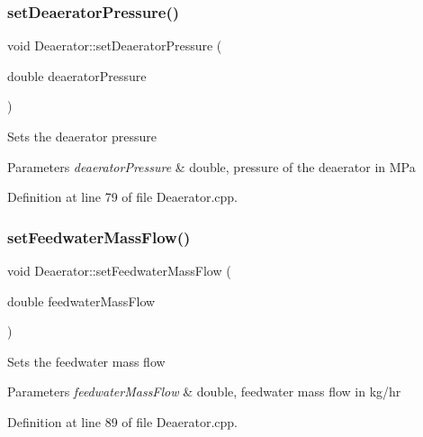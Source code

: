 \subsubsection{\texorpdfstring{set\+Deaerator\+Pressure()}{setDeaeratorPressure()}\hspace{0.1cm}{\footnotesize\ttfamily [3/3]}}
{\footnotesize\ttfamily void Deaerator\+::set\+Deaerator\+Pressure (\begin{DoxyParamCaption}\item[{double}]{deaerator\+Pressure }\end{DoxyParamCaption})}

Sets the deaerator pressure 
\begin{DoxyParams}{Parameters}
{\em deaerator\+Pressure} & double, pressure of the deaerator in M\+Pa \\
\hline
\end{DoxyParams}


Definition at line 79 of file Deaerator.\+cpp.

\mbox{\label{class_deaerator_ada95cb2557bc43602d7bcefbad66c853}} 
\subsubsection{\texorpdfstring{set\+Feedwater\+Mass\+Flow()}{setFeedwaterMassFlow()}\hspace{0.1cm}{\footnotesize\ttfamily [1/3]}}
{\footnotesize\ttfamily void Deaerator\+::set\+Feedwater\+Mass\+Flow (\begin{DoxyParamCaption}\item[{double}]{feedwater\+Mass\+Flow }\end{DoxyParamCaption})}

Sets the feedwater mass flow 
\begin{DoxyParams}{Parameters}
{\em feedwater\+Mass\+Flow} & double, feedwater mass flow in kg/hr \\
\hline
\end{DoxyParams}


Definition at line 89 of file Deaerator.\+cpp.

\mbox{\label{class_deaerator_ada95cb2557bc43602d7bcefbad66c853}} 
